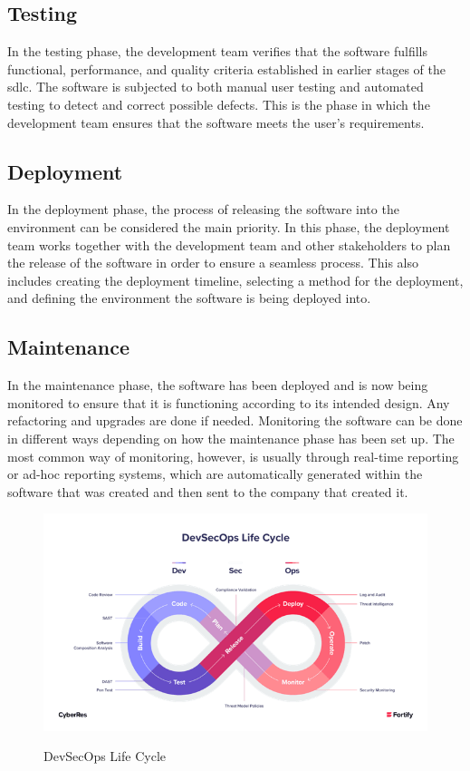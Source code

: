 \subsection{Testing}
In the testing phase, the development team verifies that the software fulfills functional, performance, and quality criteria established in earlier stages of the \acrshort{sdlc}. The software is subjected to both manual user testing and automated testing to detect and correct possible defects. This is the phase in which the development team ensures that the software meets the user's requirements.\cite{TestingSDLC}
 
\subsection{Deployment}
In the deployment phase, the process of releasing the software into the environment can be considered the main priority. In this phase, the deployment team works together with the development team and other stakeholders to plan the release of the software in order to ensure a seamless process. This also includes creating the deployment timeline, selecting a method for the deployment, and defining the environment the software is being deployed into. \cite{DeploymentSDLC}


\subsection{Maintenance} 
In the maintenance phase, the software has been deployed and is now being monitored to ensure that it is functioning according to its intended design. Any refactoring and upgrades are done if needed. Monitoring the software can be done in different ways depending on how the maintenance phase has been set up. The most common way of monitoring, however, is usually through real-time reporting or ad-hoc reporting systems, which are automatically generated within the software that was created and then sent to the company that created it.\cite{MaintenanceSDLC} 


\begin{figure}[H]
    \centering
    \includegraphics[width=0.8\columnwidth]{Images/devsec.png}
    \caption{DevSecOps Life Cycle}
    \label{fig: DevSecOps Life Cycle}\cite{devsecopsbilde}
\end{figure}


